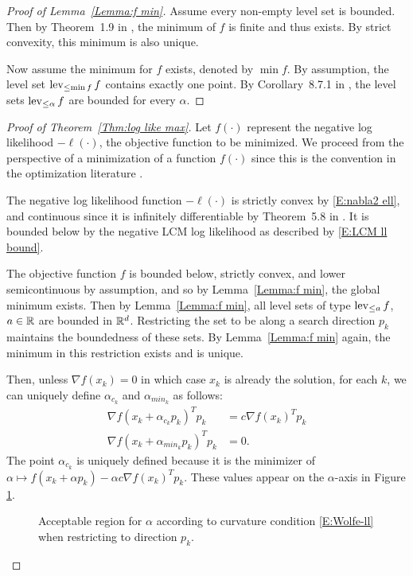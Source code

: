 
\begin{proof}[Proof of Lemma~\ref{Lemma:f min}]
Assume every non-empty level set is bounded.  Then by Theorem~1.9 in \citet
{Rockafellar}, the minimum of $f$ is finite 
and thus exists.  By strict convexity, this minimum is also unique.

Now assume the minimum for $f$ exists, denoted by $\min f$.  By assumption, the level 
set $\operatorname{lev}_{\leq \min f} f$ 
contains exactly one point.  By Corollary~8.7.1 in \citet{Rockafellar:1970}, the level 
sets $\operatorname{lev}_{\leq \alpha} f$ are 
bounded for every $\alpha$.  
\end{proof}


\begin{proof}[Proof of Theorem~\ref{Thm:log like max}]
Let $f(\cdot)$ represent the negative log likelihood $- \ell(\cdot)$, the objective 
function to be minimized.  We proceed from the perspective of a minimization of a 
function $f(\cdot)$ since this is the convention in the optimization literature \citep
{NW,Rockafellar}.  %

The negative log likelihood function $-\ell(\cdot)$ is strictly convex by 
\eqref{E:nabla2 ell}, and continuous since it is infinitely differentiable by Theorem~5.8 in \citet{TPE2}.
It is bounded below by the negative LCM log likelihood as described by \eqref{E:LCM ll bound}.

The objective function $f$ is bounded below, strictly convex, and lower semicontinuous 
by assumption, and so by Lemma~\ref{Lemma:f min}, the global minimum exists.  
Then by Lemma~\ref{Lemma:f min}, all level sets of type $\operatorname{lev}_{\leq a} f$, $a \in {\mathbb R}$ are bounded in ${\mathbb R}^d$.  Restricting the set to be along a search 
direction $p_k$ maintains the 
boundedness of these sets.  By Lemma~\ref{Lemma:f min} again, the minimum in this 
restriction exists and is unique.     

Then, unless $\nabla f( x_k ) = 0$ in which case $x_k$ is already the solution, for 
each $k$, we can uniquely define $
\alpha_{c_k}$ and $\alpha_{min_k}$ as follows: 
\begin{align}
	\nabla f( x_k + \alpha_{c_k} p_k)^T p_k &= c \nabla f(x_k)^T p_k \label{E:alphac} 
\\
	\nabla f( x_k + \alpha_{min_k} p_k)^T p_k &= 0. \label{E:alphamin} 
\end{align}
The point $\alpha_{c_k}$ is uniquely defined because it is the minimizer of $\alpha 
\mapsto f( x_k + \alpha p_k) - 
\alpha c \nabla f( x_k )^T p_k$.
These values appear on the $\alpha$-axis in Figure \ref{F:Wolfe-mod}.
\begin{figure}
\centering
\scalebox{.4}{}
\caption{Acceptable region for $\alpha$ according to curvature condition 
\eqref{E:Wolfe-ll} when restricting to direction $p_k$.}
\label{F:Wolfe-mod}
\end{figure}


\end{proof}
